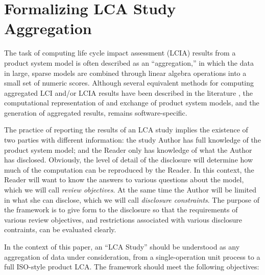 \section{Formalizing LCA Study Aggregation}

The task of computing life cycle impact assessment (LCIA) results from a product system model is often described as an ``aggregation,'' in which the data in large, sparse models are combined through linear algebra operations into a small set of numeric scores.  Although several equivalent methods for computing aggregated LCI and/or LCIA results have been described in the literature \citep{Suh_2005, Peters_2007}, the computational representation of and exchange of product system models, and the generation of aggregated results, remains software-specific.  

The practice of reporting the results of an LCA study implies the existence of two parties with different information: the study Author has full knowledge of the product system model; and the Reader only has knowledge of what the Author has disclosed.  Obviously, the level of detail of the disclosure will determine how much of the computation can be reproduced by the Reader.  In this context, the Reader will want to know the answers to various questions about the model, which we will call \emph{review objectives}.  At the same time the Author will be limited in what she can disclose, which we will call \emph{disclosure constraints}.  The purpose of the framework is to give form to the disclosure so that the requirements of various review objectives, and restrictions associated with various disclosure contraints, can be evaluated clearly.

In the context of this paper, an ``LCA Study'' should be understood as any aggregation of data under consideration, from a single-operation unit process to a full ISO-style product LCA.  The framework should meet the following objectives:

